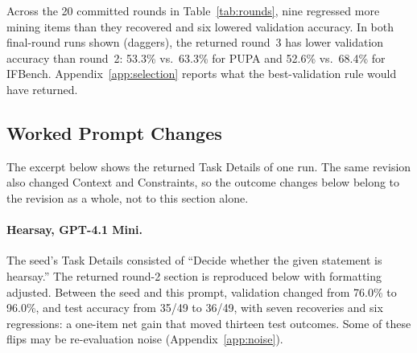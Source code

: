 \documentclass[11pt]{article}
\begin{document}
Across the 20 committed rounds in Table~\ref{tab:rounds}, nine regressed more mining items than they recovered and six
lowered validation accuracy. In both final-round runs shown (daggers), the returned round~3 has lower validation
accuracy than round~2: 53.3\% vs.\ 63.3\% for PUPA and 52.6\% vs.\ 68.4\% for IFBench. Appendix~\ref{app:selection}
reports what the best-validation rule would have returned.

\FloatBarrier
\subsection{Worked Prompt Changes}
\label{app:evolution}
The excerpt below shows the returned Task Details of one run. The same revision also changed Context and Constraints,
so the outcome changes below belong to the revision as a whole, not to this section alone.

\paragraph{Hearsay, GPT-4.1 Mini.}
The seed's Task Details consisted of ``Decide whether the given statement is hearsay.'' The returned round-2 section
is reproduced below with formatting adjusted. Between the seed and this prompt, validation changed from 76.0\% to
96.0\%, and test accuracy from 35/49 to 36/49, with seven recoveries and six regressions: a one-item net gain that
moved thirteen test outcomes. Some of these flips may be re-evaluation noise (Appendix~\ref{app:noise}).
\end{document}
